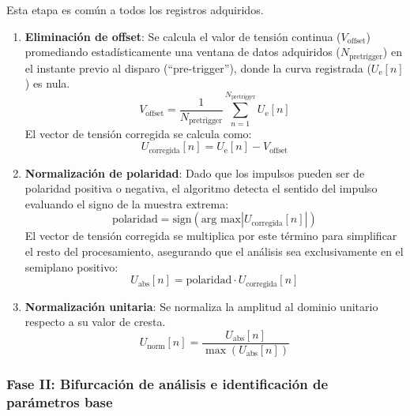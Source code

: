 Esta etapa es común a todos los registros adquiridos.
\begin{enumerate}
    \item \textbf{Eliminación de offset}: Se calcula el valor de tensión continua ($V_{\text{offset}}$) promediando estadísticamente una ventana de datos adquiridos ($N_{\text{pretrigger}}$) en el instante previo al disparo (``pre-trigger''), donde la curva registrada ($U_\text{e}[n]$) es nula.
    \begin{equation}
        V_{\text{offset}} = \frac{1}{N_{\text{pretrigger}}} \sum_{n=1}^{N_{\text{pretrigger}}} U_\text{e}[n]
        \label{eq:calculo_offset}
    \end{equation}
    El vector de tensión corregida se calcula como:
    \begin{equation}
        U_{\text{corregida}}[n] = U_\text{e}[n] - V_{\text{offset}}
        \label{eq:eliminacion_offset}
    \end{equation}
    \item \textbf{Normalización de polaridad}: Dado que los impulsos pueden ser de polaridad positiva o negativa, el algoritmo detecta el sentido del impulso evaluando el signo de la muestra extrema:
    \begin{equation}
        \text{polaridad} = \text{sign}(\text{arg max} |U_{\text{corregida}}
        [n]|)
        \label{eq:buscar_polaridad}
    \end{equation}
    El vector de tensión corregida se multiplica por este término para simplificar el resto del procesamiento, asegurando que el análisis sea exclusivamente en el semiplano positivo:
    \begin{equation}
        U_{\text{abs}}[n] = \text{polaridad} \cdot U_{\text{corregida}}[n]
        \label{eq:normalizacion_polaridad}
    \end{equation}
    \item \textbf{Normalización unitaria}: Se normaliza la amplitud al dominio unitario respecto a su valor de cresta.
    \begin{equation}
        U_{\text{norm}}[n] = \frac{U_{\text{abs}}[n]}{\max(U_{\text{abs}}[n])}
        \label{eq:onda_normalizada}
    \end{equation}
\end{enumerate}

\subsubsection{Fase II: Bifurcación de análisis e identificación de parámetros base}


